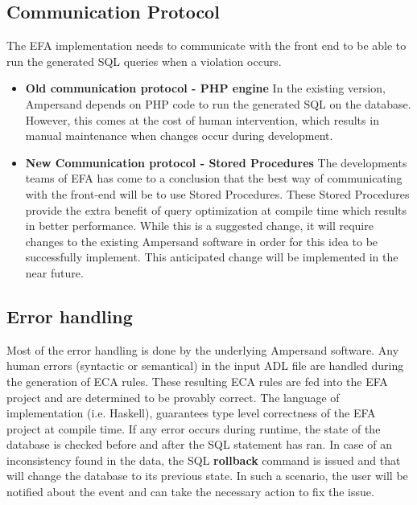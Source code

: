 \documentclass[12pt, svgnames]{article}
\let\Oldsubsection\subsection
\renewcommand{\subsection}{\FloatBarrier\Oldsubsection}
\begin{document}
\subsection{Communication Protocol}
The EFA implementation needs to communicate with the front end to be able to 
run the generated SQL queries when a violation occurs. 
	\begin{itemize}
		\item \textbf{Old communication protocol -  PHP engine} \newline
			In the existing version, Ampersand depends on PHP code to run the 
			generated SQL on the database. However, this comes at the cost of 
			human intervention, which results in manual maintenance when 
			changes occur during development. 
		\item \textbf{New Communication protocol - Stored Procedures} \newline
			The developments teams of EFA has come to a conclusion that the 
			best way of communicating with the front-end will be to use Stored 
			Procedures\cite{SP}. These Stored Procedures provide the extra 
			benefit of query optimization at compile time which results in 
			better performance. While this is a suggested change, it will 
			require changes to the existing Ampersand software in order for 
			this idea to be successfully implement. This anticipated 
			change will be implemented in the near future.
			
	\end{itemize}

\subsection{Error handling}
Most of the error handling is done by the underlying Ampersand software. Any 
human errors (syntactic or semantical) in the input ADL file are handled during 
the generation of ECA rules. These resulting ECA rules are fed into the EFA 
project and are determined to be provably correct.  The 
language of implementation (i.e. Haskell), 
guarantees type level correctness of the EFA project at compile time. 
\newline
If any error occurs during runtime, the state of the database is checked 
before and after the SQL statement has ran. In case of an inconsistency found 
in the data, the SQL \textbf{rollback} command is issued and that will change 
the database to its previous state. In such a scenario, the user will be 
notified about the event and can take the necessary action to fix the issue. 
\end{document}
